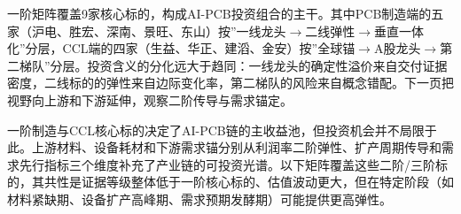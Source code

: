 一阶矩阵覆盖9家核心标的，构成AI-PCB投资组合的主干。其中PCB制造端的五家（沪电、胜宏、深南、景旺、东山）按”一线龙头$\to$二线弹性$\to$垂直一体化”分层，CCL端的四家（生益、华正、建滔、金安）按”全球锚$\to$A股龙头$\to$第二梯队”分层。投资含义的分化远大于趋同：一线龙头的确定性溢价来自交付证据密度，二线标的的弹性来自边际变化率，第二梯队的风险来自概念错配。下一页把视野向上游和下游延伸，观察二阶传导与需求锚定。

\clearpage

一阶制造与CCL核心标的决定了AI-PCB链的主收益池，但投资机会并不局限于此。上游材料、设备耗材和下游需求锚分别从利润率二阶弹性、扩产周期传导和需求先行指标三个维度补充了产业链的可投资光谱。以下矩阵覆盖这些二阶/三阶标的，其共性是证据等级整体低于一阶核心标的、估值波动更大，但在特定阶段（如材料紧缺期、设备扩产高峰期、需求预期发酵期）可能提供更高弹性。

